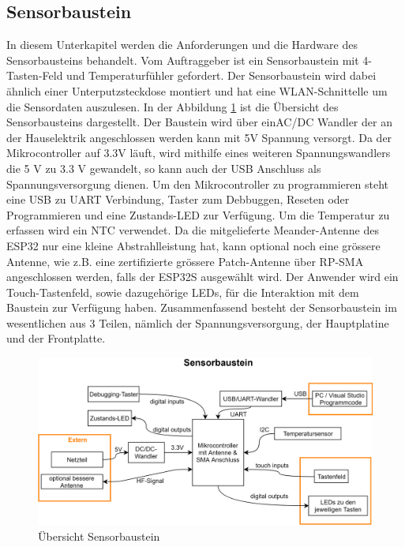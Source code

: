 \subsection{Sensorbaustein}\label{subsec: Sensorbaustein}
\label{sec: Sensorbaustein}
In diesem Unterkapitel werden die Anforderungen und die Hardware des Sensorbausteins behandelt.
Vom Auftraggeber ist ein Sensorbaustein mit 4-Tasten-Feld und Temperaturfühler gefordert. Der Sensorbaustein wird dabei ähnlich einer Unterputzsteckdose montiert und hat eine WLAN-Schnittelle um die Sensordaten auszulesen. In der Abbildung \ref{pic: Uebersicht_Sensorbaustein} ist die Übersicht des Sensorbausteins dargestellt. Der Baustein wird über einAC/DC Wandler der an der Hauselektrik angeschlossen werden kann mit 5V Spannung versorgt. Da der Mikrocontroller auf 3.3V läuft, wird mithilfe eines weiteren Spannungswandlers die 5 V zu 3.3 V gewandelt, so kann auch der USB Anschluss als Spannungsversorgung dienen. Um den Mikrocontroller zu programmieren steht eine USB zu UART Verbindung, Taster zum Debbuggen, Reseten oder Programmieren und eine Zustands-LED zur Verfügung. Um die Temperatur zu erfassen wird ein NTC verwendet. Da die mitgelieferte Meander-Antenne des ESP32 nur eine kleine Abstrahlleistung hat, kann optional noch eine grössere Antenne, wie z.B. eine zertifizierte grössere Patch-Antenne über RP-SMA angeschlossen werden, falls der ESP32S ausgewählt wird. Der Anwender wird ein Touch-Tastenfeld, sowie dazugehörige LEDs, für die Interaktion mit dem Baustein zur Verfügung haben. Zusammenfassend besteht der Sensorbaustein im wesentlichen aus 3 Teilen, nämlich der Spannungsversorgung, der Hauptplatine und der Frontplatte.

\begin{figure}[H]
	\centering
	\includegraphics[width=\textwidth]{graphics/Sensorbaustein.png}
	\caption{Übersicht Sensorbaustein}
	\label{pic: Uebersicht_Sensorbaustein}
\end{figure} 



